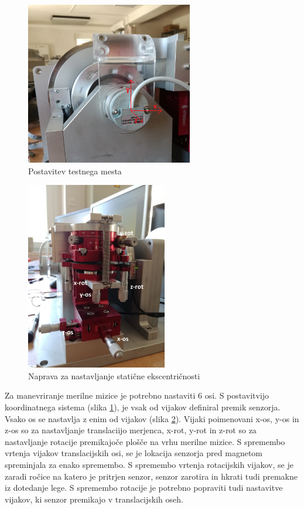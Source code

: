 \begin{figure}[!ht]
	\centering
	\includegraphics[width=0.65\textwidth]{./Slike/koordinatnisistem.jpg}
	\caption{Postavitev testnega mesta}
	\label{koordinatnisistem.jpg}
\end{figure}
\begin{figure}[!ht]
	\centering
	\includegraphics[width=0.55\textwidth]{./Slike/HTIMS601.jpg}
	\caption{Naprava za nastavljanje statične ekscentričnosti}
	\label{HTIMS601.jpg}
\end{figure}
Za manevriranje merilne mizice je potrebno nastaviti 6 osi.
S postavitvijo koordinatnega sistema (slika \ref{koordinatnisistem.jpg}), je vsak od vijakov definiral premik senzorja. 
Vsako os se nastavlja z enim od vijakov (slika \ref{HTIMS601.jpg}). Vijaki poimenovani x-os, y-os in z-os so za nastavljanje translaciijo merjenca, x-rot, y-rot in z-rot so za nastavljanje rotacije premikajoče plošče na vrhu merilne mizice.
S spremembo vrtenja vijakov translacijskih osi, se je lokacija senzorja pred magnetom spreminjala za enako spremembo. S spremembo vrtenja rotacijskih vijakov, se je zaradi ročice na katero je pritrjen senzor, senzor zarotira in hkrati tudi premakne iz dotedanje lege. S spremembo rotacije je potrebno popraviti tudi nastavitve vijakov, ki senzor premikajo v translacijskih oseh.

